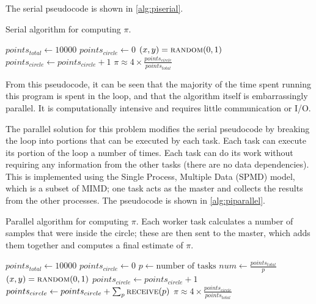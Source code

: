 The serial pseudocode is shown in \autoref{alg:piserial}.
\begin{algorithm}  
\caption{Serial algorithm for computing $\pi$.}
\label{alg:piserial}
\begin{algorithmic}
\State $points_{total} \gets 10000$
\State $points_{circle} \gets 0$
	\State $(x, y) = \Call{random}{0, 1}$
		\State $points_{circle} \gets points_{circle} + 1$
	\EndIf
\EndFor
\State $\pi \approx 4 \times \frac{points_{circle}}{points_{total}}$
\end{algorithmic}
\end{algorithm}
From this pseudocode, it can be seen that the majority of the time spent running this program is spent in the loop, and that the algorithm itself is embarrassingly parallel. It is computationally intensive and requires little communication or I/O.

The parallel solution for this problem modifies the serial pseudocode by breaking the loop into portions that can be executed by each task. Each task can execute its portion of the loop a number of times. Each task can do its work without requiring any information from the other tasks (there are no data dependencies). This is implemented using the Single Process, Multiple Data (SPMD) model, which is a subset of MIMD; one task acts as the master and collects the results from the other processes. The pseudocode is shown in \autoref{alg:piparallel}.
\begin{algorithm}  
\caption[Parallel algorithm for computing $\pi$.]{Parallel algorithm for computing $\pi$. Each worker task calculates a number of samples that were inside the circle; these are then sent to the master, which adds them together and computes a final estimate of $\pi$.}
\label{alg:piparallel}
\begin{algorithmic}
\State $points_{total} \gets 10000$
\State $points_{circle} \gets 0$
\State $p \gets \text{number of tasks}$
\State $num \gets \frac{points_{total}}{p}$
	\State $(x, y) = \Call{random}{0, 1}$
		\State $points_{circle} \gets points_{circle} + 1$
	\EndIf
\EndFor
{}
	\State $points_{circle} \gets points_{circle} + \sum_p \Call{receive}{p}$
	\State $\pi \approx 4 \times \frac{points_{circle}}{points_{total}}$
\Else
	\State {}
\EndIf
\end{algorithmic}
\end{algorithm}

